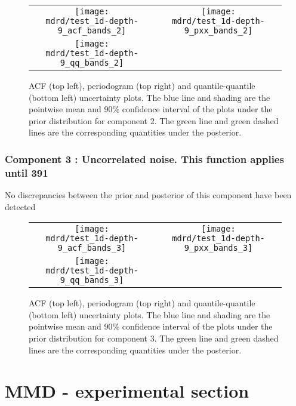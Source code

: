 \documentclass{article} %
\begin{document}
\begin{figure}[H]
\newcommand{\wmgd}{0.5\columnwidth}
\newcommand{\hmgd}{3.0cm}
\newcommand{\mdrd}{test_1d-depth-9}
\newcommand{\mbm}{\hspace{-0.3cm}}
\begin{tabular}{cc}
\mbm \texttt{[image: \\mdrd/test\_1d-depth-9\_acf\_bands\_2]} & \texttt{[image: \\mdrd/test\_1d-depth-9\_pxx\_bands\_2]} \\
\mbm \texttt{[image: \\mdrd/test\_1d-depth-9\_qq\_bands\_2]}
\end{tabular}
\caption{
ACF (top left), periodogram (top right) and quantile-quantile (bottom left) uncertainty plots.
The blue line and shading are the pointwise mean and 90\% confidence interval of the plots under the prior distribution for component 2.
The green line and green dashed lines are the corresponding quantities under the posterior.}
\label{fig:check2}
\end{figure}

\subsubsection{Component 3 : Uncorrelated noise. This function applies until  391}

No discrepancies between the prior and posterior of this component have been detected

\begin{figure}[H]
\newcommand{\wmgd}{0.5\columnwidth}
\newcommand{\hmgd}{3.0cm}
\newcommand{\mdrd}{test_1d-depth-9}
\newcommand{\mbm}{\hspace{-0.3cm}}
\begin{tabular}{cc}
\mbm \texttt{[image: \\mdrd/test\_1d-depth-9\_acf\_bands\_3]} & \texttt{[image: \\mdrd/test\_1d-depth-9\_pxx\_bands\_3]} \\
\mbm \texttt{[image: \\mdrd/test\_1d-depth-9\_qq\_bands\_3]}
\end{tabular}
\caption{
ACF (top left), periodogram (top right) and quantile-quantile (bottom left) uncertainty plots.
The blue line and shading are the pointwise mean and 90\% confidence interval of the plots under the prior distribution for component 3.
The green line and green dashed lines are the corresponding quantities under the posterior.}
\label{fig:check3}
\end{figure}

\section{MMD - experimental section}
\label{sec:mmd}
\end{document}
